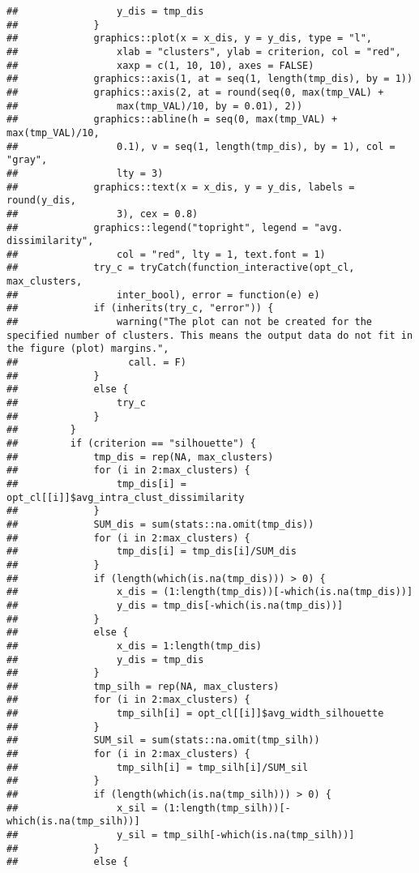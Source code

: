 \documentclass[
]{article}
\begin{document}
\begin{verbatim}
##                 y_dis = tmp_dis
##             }
##             graphics::plot(x = x_dis, y = y_dis, type = "l", 
##                 xlab = "clusters", ylab = criterion, col = "red", 
##                 xaxp = c(1, 10, 10), axes = FALSE)
##             graphics::axis(1, at = seq(1, length(tmp_dis), by = 1))
##             graphics::axis(2, at = round(seq(0, max(tmp_VAL) + 
##                 max(tmp_VAL)/10, by = 0.01), 2))
##             graphics::abline(h = seq(0, max(tmp_VAL) + max(tmp_VAL)/10, 
##                 0.1), v = seq(1, length(tmp_dis), by = 1), col = "gray", 
##                 lty = 3)
##             graphics::text(x = x_dis, y = y_dis, labels = round(y_dis, 
##                 3), cex = 0.8)
##             graphics::legend("topright", legend = "avg. dissimilarity", 
##                 col = "red", lty = 1, text.font = 1)
##             try_c = tryCatch(function_interactive(opt_cl, max_clusters, 
##                 inter_bool), error = function(e) e)
##             if (inherits(try_c, "error")) {
##                 warning("The plot can not be created for the specified number of clusters. This means the output data do not fit in the figure (plot) margins.", 
##                   call. = F)
##             }
##             else {
##                 try_c
##             }
##         }
##         if (criterion == "silhouette") {
##             tmp_dis = rep(NA, max_clusters)
##             for (i in 2:max_clusters) {
##                 tmp_dis[i] = opt_cl[[i]]$avg_intra_clust_dissimilarity
##             }
##             SUM_dis = sum(stats::na.omit(tmp_dis))
##             for (i in 2:max_clusters) {
##                 tmp_dis[i] = tmp_dis[i]/SUM_dis
##             }
##             if (length(which(is.na(tmp_dis))) > 0) {
##                 x_dis = (1:length(tmp_dis))[-which(is.na(tmp_dis))]
##                 y_dis = tmp_dis[-which(is.na(tmp_dis))]
##             }
##             else {
##                 x_dis = 1:length(tmp_dis)
##                 y_dis = tmp_dis
##             }
##             tmp_silh = rep(NA, max_clusters)
##             for (i in 2:max_clusters) {
##                 tmp_silh[i] = opt_cl[[i]]$avg_width_silhouette
##             }
##             SUM_sil = sum(stats::na.omit(tmp_silh))
##             for (i in 2:max_clusters) {
##                 tmp_silh[i] = tmp_silh[i]/SUM_sil
##             }
##             if (length(which(is.na(tmp_silh))) > 0) {
##                 x_sil = (1:length(tmp_silh))[-which(is.na(tmp_silh))]
##                 y_sil = tmp_silh[-which(is.na(tmp_silh))]
##             }
##             else {

\end{verbatim}
\end{document}
